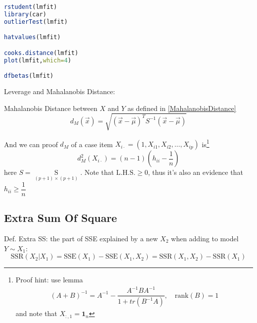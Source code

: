     
 


\begin{rcode}
\begin{lstlisting}[language=R]
rstudent(lmfit)
library(car)
outlierTest(lmfit)

hatvalues(lmfit)

cooks.distance(lmfit)
plot(lmfit,which=4)

dfbetas(lmfit)
\end{lstlisting}
\end{rcode}

















Leverage and Mahalanobis Distance:
    
Mahalanobis Distance between $ X $ and $ Y $ as defined in \autoref{MahalanobisDistance}
\begin{equation}
     d_M(\vec{x})=\sqrt{(\vec{x}-\vec{\mu})^TS ^{-1}(\vec{x}-\vec{\mu})} 
\end{equation}

And we can proof $ d_M $ of a case item $ X_{ i\cdot}=(1,X_{i1},X_{i2},\ldots,X_{ip}) $ is\footnote{Proof hint: use lemma 
\begin{align*}
    (A+B)^{-1}=A^{-1}-\dfrac{A^{-1}BA^{-1}}{1+tr(B^{-1}A)},\quad \mathrm{rank}(B)=1 
\end{align*}
and note that $ X_{:,1}=\mathbf{1}_n $
}
\begin{equation}
    d_{M}^2(X_{i\cdot})=(n-1)(h_{ii}-\dfrac{1}{n}) 
\end{equation}
here $ S=\mathop{S}\limits_{(p+1)\times (p+1)}  $. Note that $  \mathrm{L.H.S.}\geq 0$, thus it's also an evidence that $ h_{ii}\geq \dfrac{1}{n} $

\subsection{Extra Sum Of Square}\label{SubSubSectionExtraSumOfSquare}
    Def. Extra SS: the part of SSE explained by a new $ X_2 $ when adding to model $ Y\sim X_1 $:
    \begin{equation}
        \mathrm{SSR}(X_2|X_1)=\mathrm{SSE}(X_1)-\mathrm{SSE}(X_1,X_2)=\mathrm{SSR}(X_1,X_2)-\mathrm{SSR}(X_1)  
    \end{equation}

